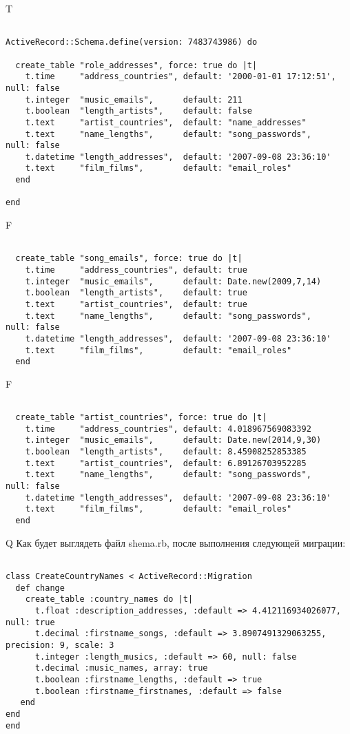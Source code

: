 T
\begin{verbatim}

ActiveRecord::Schema.define(version: 7483743986) do

  create_table "role_addresses", force: true do |t|
    t.time     "address_countries", default: '2000-01-01 17:12:51', null: false
    t.integer  "music_emails",      default: 211
    t.boolean  "length_artists",    default: false
    t.text     "artist_countries",  default: "name_addresses"
    t.text     "name_lengths",      default: "song_passwords",      null: false
    t.datetime "length_addresses",  default: '2007-09-08 23:36:10'
    t.text     "film_films",        default: "email_roles"
  end

end
\end{verbatim}


F
\begin{verbatim}

  create_table "song_emails", force: true do |t|
    t.time     "address_countries", default: true
    t.integer  "music_emails",      default: Date.new(2009,7,14)
    t.boolean  "length_artists",    default: true
    t.text     "artist_countries",  default: true
    t.text     "name_lengths",      default: "song_passwords",      null: false
    t.datetime "length_addresses",  default: '2007-09-08 23:36:10'
    t.text     "film_films",        default: "email_roles"
  end

\end{verbatim}

F
\begin{verbatim}

  create_table "artist_countries", force: true do |t|
    t.time     "address_countries", default: 4.018967569083392
    t.integer  "music_emails",      default: Date.new(2014,9,30)
    t.boolean  "length_artists",    default: 8.45908252853385
    t.text     "artist_countries",  default: 6.89126703952285
    t.text     "name_lengths",      default: "song_passwords",      null: false
    t.datetime "length_addresses",  default: '2007-09-08 23:36:10'
    t.text     "film_films",        default: "email_roles"
  end

\end{verbatim}

Q
Как будет выглядеть файл shema.rb, после выполнения следующей миграции:

\begin{verbatim}

class CreateCountryNames < ActiveRecord::Migration 
  def change 
    create_table :country_names do |t| 
      t.float :description_addresses, :default => 4.412116934026077, null: true
      t.decimal :firstname_songs, :default => 3.8907491329063255, precision: 9, scale: 3
      t.integer :length_musics, :default => 60, null: false
      t.decimal :music_names, array: true
      t.boolean :firstname_lengths, :default => true
      t.boolean :firstname_firstnames, :default => false
   end
end
end
\end{verbatim}

